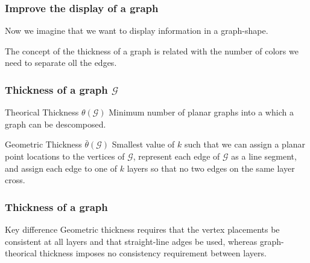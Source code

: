 \documentclass[12 pt]{beamer}
\begin{document}
\begin{frame}{2}
    \frametitle{Improve the display of a graph}
    Now we imagine that we want to display information in a graph-shape.
    

    The concept of the thickness of a graph is related with the number of colors we need to separate oll the edges.
    
\end{frame}

\begin{frame}{3}
    \frametitle{Thickness of a graph $\mathcal{G}$}
  
    \begin{block}{Theorical Thickness $\theta (\mathcal{G})$}
    Minimum number of planar graphs into a which a graph can be descomposed.
    \end{block}
    
    \pause
    
    \begin{block}{Geometric Thickness $\bar{\theta} (\mathcal{G})$}
    Smallest value of $k$ such that we can assign a planar point locations to the vertices of $\mathcal{G}$, represent each edge of $\mathcal{G}$ as a line segment, and assign each edge to one of $k$ layers so that no two edges on the same layer cross.
    \end{block}

\end{frame}

\begin{frame}{4}
    \frametitle{Thickness of a graph}
  
    \begin{alertblock}{Key difference}
    Geometric thickness requires that the vertex placements be consistent at all layers and that straight-line adges be used, whereas graph-theorical thickness imposes no consistency requirement between layers.
    \end{alertblock}
\end{frame}
\end{document}
